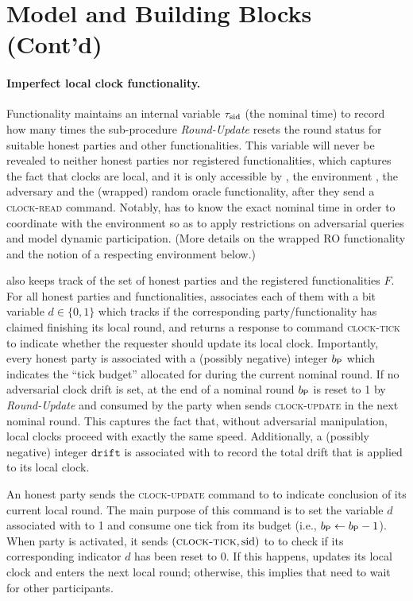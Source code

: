 \section{Model and Building Blocks (Cont'd)}
\label{section:model-contd}

\paragraph{Imperfect local clock functionality.}
%
Functionality \funcImpClock maintains an internal variable $\tau_\mathrm{sid}$ (the nominal time) to record how many times the sub-procedure \textit{Round-Update} resets the round status for suitable honest parties and other functionalities.
%
This variable will never be revealed to neither honest parties nor registered
functionalities, which captures the fact that clocks are local, and it is only
accessible by \funcImpClock, the environment \environment, the adversary \adv and the (wrapped) random oracle functionality\wrapper{\funcRO}, after they send a \textsc{clock-read} command.
%
Notably, \wrapper{\funcRO} has to know the exact nominal time in order to coordinate with the environment so as to apply restrictions on adversarial queries and model dynamic participation.
%
(More details on the wrapped RO functionality and the notion of a respecting environment below.)

\funcImpClock also keeps track of the set of honest parties \partyset and the registered functionalities $F$.
%
For all honest parties and functionalities, \funcImpClock associates each of them with a bit variable $d \in \{0, 1\}$ which tracks if the corresponding party/functionality has claimed finishing its local round, and returns a response to command \textsc{clock-tick} to indicate whether the requester should update its local clock.
%
Importantly, every honest party \party is associated with a (possibly negative) integer $b_\mathsf{P}$ which indicates the ``tick budget'' allocated for \party during the current nominal round.
%
If no adversarial clock drift is set, at the end of a nominal round $b_\mathsf{P}$ is reset to 1 by \textit{Round-Update} and consumed by the party when \party sends \textsc{clock-update} in the next nominal round.
%
This captures the fact that, without adversarial manipulation, local clocks proceed with exactly the same speed.
%
Additionally, a (possibly negative) integer $\mathtt{drift}$ is associated with \party to record the total drift that is applied to its local clock.

An honest party \party sends the \textsc{clock-update} command to \funcImpClock to indicate conclusion of its current local round.
%
The main purpose of this command is to set the variable $d$ associated with \party to 1 and consume one tick from its budget (i.e., $b_\mathsf{P} \gets b_\mathsf{P} - 1$).
%
When party \party is activated, it sends $(\textsc{clock-tick}, \mathrm{sid})$ to \funcImpClock to check if its corresponding indicator $d$ has been reset to 0.
%
If this happens, \party updates its local clock and enters the next local round; otherwise, this implies that \party need to wait for other participants.

